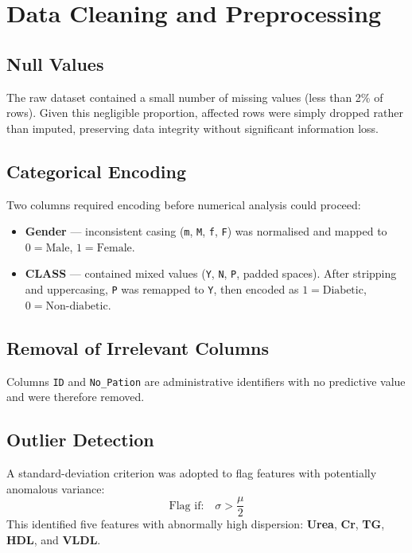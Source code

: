 \documentclass[12pt, a4paper]{article}
\begin{document}
\section{Data Cleaning and Preprocessing}

\subsection{Null Values}

The raw dataset contained a small number of missing values (less than 2\% of
rows). Given this negligible proportion, affected rows were simply dropped
rather than imputed, preserving data integrity without significant information
loss.

\subsection{Categorical Encoding}

Two columns required encoding before numerical analysis could proceed:

\begin{itemize}
    \item \textbf{Gender} --- inconsistent casing (\texttt{m}, \texttt{M},
          \texttt{f}, \texttt{F}) was normalised and mapped to
          $0 = \text{Male}$, $1 = \text{Female}$.
    \item \textbf{CLASS} --- contained mixed values (\texttt{Y}, \texttt{N},
          \texttt{P}, padded spaces). After stripping and uppercasing,
          \texttt{P} was remapped to \texttt{Y}, then encoded as
          $1 = \text{Diabetic}$, $0 = \text{Non-diabetic}$.
\end{itemize}

\subsection{Removal of Irrelevant Columns}

Columns \texttt{ID} and \texttt{No\_Pation} are administrative identifiers
with no predictive value and were therefore removed.

\subsection{Outlier Detection}

A standard-deviation criterion was adopted to flag features with potentially
anomalous variance:
\[
    \text{Flag if:}\quad \sigma > \frac{\mu}{2}
\]
This identified five features with abnormally high dispersion: \textbf{Urea},
\textbf{Cr}, \textbf{TG}, \textbf{HDL}, and \textbf{VLDL}.
\end{document}
